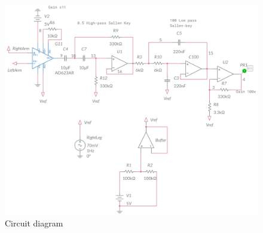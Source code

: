 \begin{figure}[h]
	\includegraphics[width=1.0\textwidth]{./figures/Pic1.png}
    \caption{Circuit diagram}
    \label{fig:example}
\end{figure}

